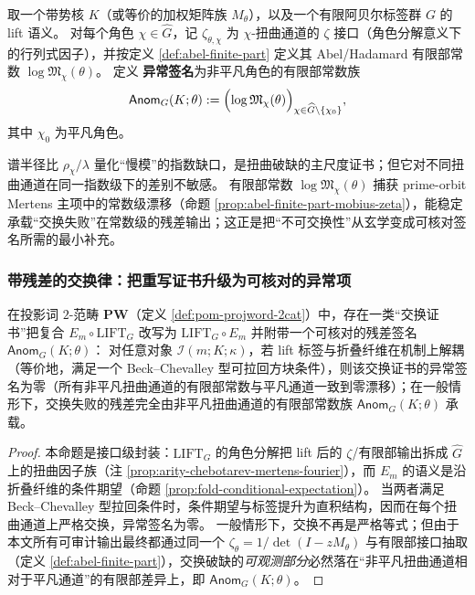 \begin{definition}[扭曲有限部异常签名]\label{def:pom-anom-signature}
取一个带势核 \(K\)（或等价的加权矩阵族 \(M_\theta\)），以及一个有限阿贝尔标签群 \(G\) 的 lift 语义。
对每个角色 \(\chi\in\widehat G\)，记 \(\zeta_{\theta,\chi}\) 为 \(\chi\)-扭曲通道的 \(\zeta\) 接口（角色分解意义下的行列式因子），并按定义 \ref{def:abel-finite-part} 定义其 Abel/Hadamard 有限部常数 \(\log\mathfrak{M}_\chi(\theta)\)。
定义 \textbf{异常签名}为非平凡角色的有限部常数族
$$
\mathsf{Anom}_{G}(K;\theta)
:=\Bigl(\log\mathfrak{M}_\chi(\theta)\Bigr)_{\chi\in\widehat G\setminus\{\chi_0\}},
$$
其中 \(\chi_0\) 为平凡角色。
\end{definition}

\begin{remark}[为何选有限部而非仅选谱半径比]\label{rem:pom-anom-why-finite-part}
谱半径比 \(\rho_\chi/\lambda\) 量化“慢模”的指数缺口，是扭曲破缺的主尺度证书；但它对不同扭曲通道在同一指数级下的差别不敏感。
有限部常数 \(\log\mathfrak{M}_\chi(\theta)\) 捕获 prime-orbit Mertens 主项中的常数级漂移（命题 \ref{prop:abel-finite-part-mobius-zeta}），能稳定承载“交换失败”在常数级的残差输出；这正是把“不可交换性”从玄学变成可核对签名所需的最小补充。
\end{remark}

\subsubsection{带残差的交换律：把重写证书升级为可核对的异常项}\label{subsec:pom-residual-swap}

\begin{proposition}\label{prop:pom-em-lift-residual-swap}
在投影词 $2$-范畴 \(\mathbf{PW}\)（定义 \ref{def:pom-projword-2cat}）中，存在一类“交换证书”把复合
\(
E_m\circ \mathrm{LIFT}_G
\)
改写为
\(
\mathrm{LIFT}_G\circ E_m
\)
并附带一个可核对的残差签名 \(\mathsf{Anom}_G(K;\theta)\)：
对任意对象 \(\mathcal{I}(m;K;\kappa)\)，若 lift 标签与折叠纤维在机制上解耦（等价地，满足一个 Beck--Chevalley 型可拉回方块条件），则该交换证书的异常签名为零（所有非平凡扭曲通道的有限部常数与平凡通道一致到零漂移）；在一般情形下，交换失败的残差完全由非平凡扭曲通道的有限部常数族 \(\mathsf{Anom}_G(K;\theta)\) 承载。
\end{proposition}

\begin{proof}
本命题是接口级封装：\(\mathrm{LIFT}_G\) 的角色分解把 lift 后的 \(\zeta\)/有限部输出拆成 \(\widehat G\) 上的扭曲因子族（注 \ref{prop:arity-chebotarev-mertens-fourier}），而 \(E_m\) 的语义是沿折叠纤维的条件期望（命题 \ref{prop:fold-conditional-expectation}）。
当两者满足 Beck--Chevalley 型拉回条件时，条件期望与标签提升为直积结构，因而在每个扭曲通道上严格交换，异常签名为零。
一般情形下，交换不再是严格等式；但由于本文所有可审计输出最终都通过同一个 \(\zeta_\theta=1/\det(I-zM_\theta)\) 与有限部接口抽取（定义 \ref{def:abel-finite-part}），交换破缺的\emph{可观测部分}必然落在“非平凡扭曲通道相对于平凡通道”的有限部差异上，即 \(\mathsf{Anom}_G(K;\theta)\)。
\end{proof}


